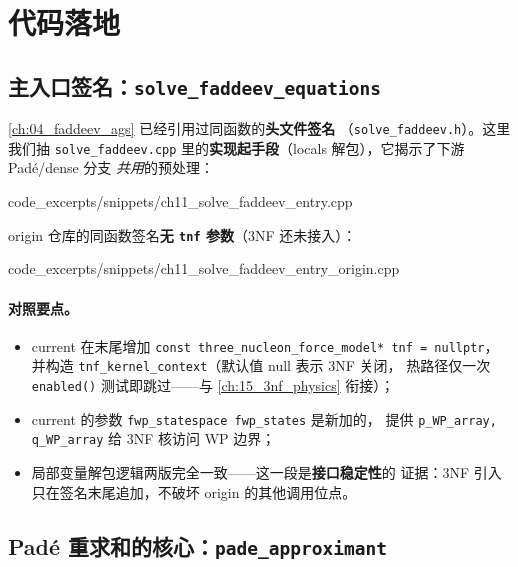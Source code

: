 \section{代码落地}
\label{sec:ch11-code}

\subsection{主入口签名：\texttt{solve\_faddeev\_equations}}
\label{subsec:ch11-entry}

\cref{ch:04_faddeev_ags} 已经引用过同函数的\textbf{头文件签名}
（\texttt{solve\_faddeev.h}）。这里我们抽 \texttt{solve\_faddeev.cpp}
里的\textbf{实现起手段}（locals 解包），它揭示了下游 Padé/dense 分支
\emph{共用}的预处理：


  {code_excerpts/snippets/ch11_solve_faddeev_entry.cpp}

origin 仓库的同函数签名\textbf{无 \texttt{tnf} 参数}（3NF 还未接入）：


  {code_excerpts/snippets/ch11_solve_faddeev_entry_origin.cpp}

\paragraph{对照要点。}
\begin{itemize}
  \item current 在末尾增加 \texttt{const three\_nucleon\_force\_model* tnf = nullptr}，
        并构造 \texttt{tnf\_kernel\_context}（默认值 null 表示 3NF 关闭，
        热路径仅一次 \texttt{enabled()} 测试即跳过——与 \cref{ch:15_3nf_physics} 衔接）；
  \item current 的参数 \texttt{fwp\_statespace fwp\_states} 是新加的，
        提供 \texttt{p\_WP\_array, q\_WP\_array} 给 3NF 核访问 WP 边界；
  \item 局部变量解包逻辑两版完全一致——这一段是\textbf{接口稳定性}的
        证据：3NF 引入只在签名末尾追加，不破坏 origin 的其他调用位点。
\end{itemize}

\subsection{Padé 重求和的核心：\texttt{pade\_approximant}}
\label{subsec:ch11-pade-approximant}

